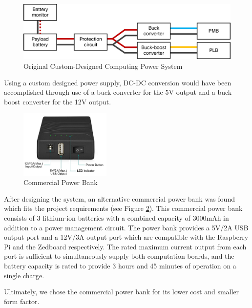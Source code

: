 \begin{figure}[H]
\centering
\includegraphics[width=13cm]{img/Power_Diagram.png}
\caption{Original Custom-Designed Computing Power System}
\label{powerdiag}
\end{figure}

Using a custom designed power supply, DC-DC conversion would have been accomplished through use of a buck converter for the 5V output and a buck-boost converter for the 12V output.

\begin{figure}[H]
\centering
\includegraphics[width=0.4\textwidth]{img/power_bank.png}
\caption{Commercial Power Bank}
\label{powerbank}
\end{figure}

After designing the system, an alternative commercial power bank was found which fits the project requirements (see Figure \ref{powerbank}). This commercial power bank consists of 3 lithium-ion batteries with a combined capacity of 3000mAh in addition to a power management circuit. The power bank provides a 5V/2A USB output port and a 12V/3A output port which are compatible with the Raspberry Pi and the Zedboard respectively. The rated maximum current output from each port is sufficient to simultaneously supply both computation boards, and the battery capacity is rated to provide 3 hours and 45 minutes of operation on a single charge.

Ultimately, we chose the commercial power bank for its lower cost and smaller form factor.
